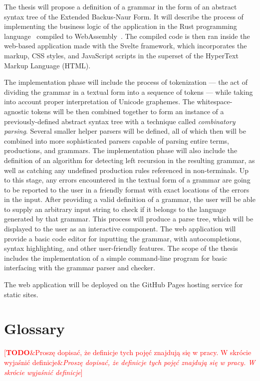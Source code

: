 \documentclass[english,bachelors,forcepolishlogotype]{wizthesis}
\newcommand{\todo}[1]{%
  \textcolor{red}{[\textbf{TODO}\ifx&#1&{}\else{ }\fi\emph{#1}]}%
}
\begin{document}
The thesis will propose a definition of a grammar in the form of an abstract
syntax tree of the Extended Backus-Naur Form. It will describe the process of
implementing the business logic of the application in the Rust programming
language~\cite{rust} compiled to WebAssembly~\cite{webassembly}. The compiled
code is then ran inside the web-based application made with the Svelte
framework, which incorporates the markup, CSS styles, and JavaScript scripts in
the superset of the HyperText Markup Language (HTML).

The implementation phase will include the process of tokenization --- the act of
dividing the grammar in a textual form into a sequence of tokens --- while
taking into account proper interpretation of Unicode graphemes. The
whitespace-agnostic tokens will be then combined together to form an instance of
a previously-defined abstract syntax tree with a technique called
\emph{combinatory parsing}. Several smaller helper parsers will be defined, all
of which then will be combined into more sophisticated parsers capable of
parsing entire terms, productions, and grammars. The implementation phase will
also include the definition of an algorithm for detecting left recursion in the
resulting grammar, as well as catching any undefined production rules referenced
in non-terminals. Up to this stage, any errors encountered in the textual form
of a grammar are going to be reported to the user in a friendly format with
exact locations of the errors in the input. After providing a valid definition
of a grammar, the user will be able to supply an arbitrary input string to check
if it belongs to the language generated by that grammar. This process will
produce a parse tree, which will be displayed to the user as an interactive
component. The web application will provide a basic code editor for inputting
the grammar, with autocompletions, syntax highlighting, and other user-friendly
features. The scope of the thesis includes the implementation of a simple
command-line program for basic interfacing with the grammar parser and checker.

The web application will be deployed on the GitHub Pages hosting service for
static sites.

\newpage

\section{Glossary}

\todo{Proszę dopisać, że definicje tych pojęć znajdują się w pracy. W skrócie
wyjaśnić definicje}
\end{document}
